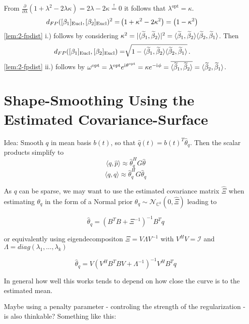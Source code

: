 From $\frac{\partial}{\partial\lambda}\left( 1 + \lambda^2 - 2\lambda\kappa \right) = 2\lambda - 2\kappa \overset{!}{=} 0$ it follows that $\lambda^\mathrm{opt} = \kappa$.
\begin{align*}
  d_{FP}([\beta_1]_{\mathrm{Eucl}},[\beta_2]_{\mathrm{Eucl}})^2 
   = &  \left( 1 + \kappa^2  - 2 \kappa^2 \right) =  \left( 1 - \kappa^2 \right)
\end{align*}
\cref{lem:2-fpdist} i.) follows by considering $\kappa^2 = \lvert\langle \widetilde \beta_1, \widetilde \beta_2 \rangle\rvert^2 = \langle \widetilde \beta_1, \widetilde \beta_2 \rangle \langle \widetilde \beta_2, \widetilde \beta_1 \rangle$.
Then
\begin{align*}
  d_{FP}([\beta_1]_{\mathrm{Eucl}},[\beta_2]_{\mathrm{Eucl}})
   = &  \sqrt{ 1 - \langle \widetilde \beta_1, \widetilde \beta_2 \rangle \langle \widetilde \beta_2, \widetilde \beta_1 \rangle }\,.
\end{align*}
\cref{lem:2-fpdist} ii.) follows by $\omega^\mathrm{opt} = \lambda^\mathrm{opt} e^{\mathrm{i}\mkern1mu \theta^\mathrm{opt}} = \kappa e^{-\mathrm{i}\mkern1mu\phi} = \overline{\langle \widetilde \beta_1, \widetilde \beta_2 \rangle} = \langle \widetilde \beta_2, \widetilde \beta_1 \rangle$.


\section{Shape-Smoothing Using the Estimated Covariance-Surface}
\label{app:a-smooth}
Idea: Smooth $q$ in mean basis $b(t)$, so that $\hat{q}(t) = b(t)^T \hat{\theta}_q$. Then the scalar products simplify to
$$ \langle q, \hat{p} \rangle \approx \hat{\theta}_q^H G \hat{\theta} $$
$$ \langle q, q \rangle \approx \hat{\theta}_q^H G \hat{\theta}_q $$

As $q$ can be sparse, we may want to use the estimated covariance matrix $\hat{\Xi}$ when estimating $\theta_q$ in the form of a Normal prior $\theta_q \sim \mathcal{N}_{\mathbb{C}^k}(0, \hat\Xi)$ leading to

$$ \hat\theta_q = (B^T B + \Xi^{-1})^{-1} B^T q $$

or equivalently using eigendecompositon $\Xi = V \Lambda V^{-1}$ with $V^H V = \mathcal{I}$ and $\Lambda = diag(\lambda_1, \dots, \lambda_k)$

$$ \hat\theta_q = V ( V^H B^T B V + \Lambda^{-1})^{-1} V^H B^T q$$

In general how well this works tends to depend on how close the curve is to the estimated mean.

Maybe using a penalty parameter - controling the strength of the regularization - is also thinkable? Something like this:

